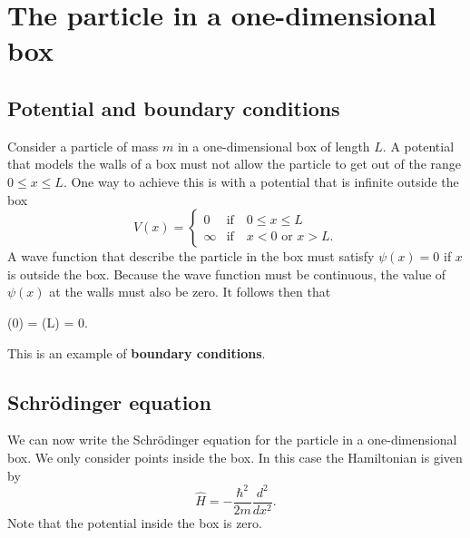 \documentclass[../Main/chem331-notes.tex]{subfiles}
\begin{document}
\setcounter{section}{5}

\section{The particle in a one-dimensional box}
\subsection{Potential and boundary conditions}
Consider a particle of mass $m$ in a one-dimensional box of length $L$.
A potential that models the walls of a box must not allow the particle to get out of the range $0 \leq x \leq L$.
One way to achieve this is with a potential that is infinite outside the box
\begin{equation}
V(x) =
\begin{cases}
0 & \text{if}\quad 0 \leq x \leq L \\
\infty & \text{if}\quad  x < 0 \text{ or } x > L.
\end{cases}
\end{equation}
A wave function that describe the particle in the box must satisfy $\psi(x) = 0$ if $x$ is outside the box.
Because the wave function must be continuous, the value of $\psi(x)$ at the walls must also be zero.
It follows then that
\begin{iequation}
\psi(0) = \psi(L) = 0.
\end{iequation}
This is an example of \textbf{boundary conditions}.

\subsection{Schr\"{o}dinger equation}
We can now write the Schr\"{o}dinger equation for the particle in a one-dimensional box.
We only consider points inside the box. In this case the Hamiltonian is given by
\begin{equation}
\hat{H} = -\frac{\hbar^2}{2m} \frac{d^2}{dx^2}.
\end{equation}
Note that the potential inside the box is zero.
\end{document}
